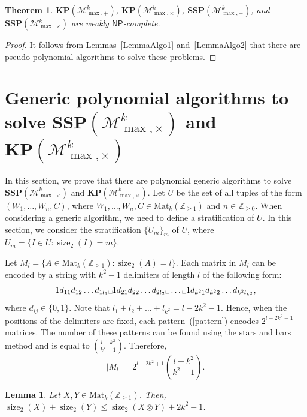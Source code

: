 \documentclass[reqno,12pt]{amsart}
\newtheorem{lemma}{Lemma}
\newtheorem{theorem}{Theorem}
\theoremstyle{definition}
\newcommand{\Mat}{\mathrm{Mat}}
\newcommand{\NP}{\mathsf{NP}}
\newcommand{\MP}{\mathcal{M}_{\max, {+}}^k}
\newcommand{\MT}{\mathcal{M}_{\max, {\times}}^k}
\newcommand{\SSMPP}{\mathbf{SSP}(\MP)}
\newcommand{\SSMTP}{\mathbf{SSP}(\MT)}
\newcommand{\KMPP}{\mathbf{KP}(\MP)}
\newcommand{\KMTP}{\mathbf{KP}(\MT)}
\DeclareMathOperator{\size}{size}
\begin{document}
\begin{theorem}\label{Th2}
$\KMPP$, $\KMTP$, $\SSMPP$, and $\SSMTP$
are weakly $\NP$-complete.
\end{theorem}
\begin{proof}
It follows from Lemmas~\ref{LemmaAlgo1} and~\ref{LemmaAlgo2} that
there are pseudo-polynomial algorithms to solve these problems.
\end{proof}

\section{Generic polynomial algorithms to solve \texorpdfstring{$\SSMTP$}{SSP(M\_{max, ×}\^{}k)} and \texorpdfstring{$\KMTP$}{KP(M\_{max, ×}\^{}k)}}

In this section, we prove that there are polynomial generic algorithms to solve $\SSMTP$ and $\KMTP$.
Let $U$ be the set of all tuples of the form $(W_1, \ldots, W_n, C)$, 
where $W_1, \ldots, W_n, C \in \Mat_k(\mathbb{Z}_{\geq 1})$ and $n \in \mathbb{Z}_{\geq 0}$.
When considering a generic algorithm, we need to define a stratification of $U$.
In this section, we consider the stratification $\{U_m\}_m$ of $U$,
where $U_m = \{I \in U : \size_2(I) = m\}$. 

Let $M_l = \{A \in \Mat_k(\mathbb{Z}_{\geq 1}) : \size_2(A) = l\}$.
Each matrix in $M_l$ can be encoded by a string with $k^2 - 1$ delimiters of length $l$ of the following form:
\begin{equation}\label{pattern}
1d_{11}d_{12}\ldots d_{1l_1} \text{\textvisiblespace} 1d_{21}d_{22}\ldots d_{2l_2}\text{\textvisiblespace}\ldots\text{\textvisiblespace}1d_{k^21}d_{k^22}\ldots d_{k^2l_{k^2}},
\end{equation}
where $d_{ij} \in \{0, 1\}$.
Note that $l_1 + l_2 + \ldots + l_{k^2} = l - 2k^2 - 1$. Hence,
when the positions of the delimiters are fixed, each pattern~(\ref{pattern}) 
encodes $2^{l - 2k^2 - 1}$
matrices. The number of these patterns can be found using the stars and bars method and is equal to $\binom{l - k^2}{k^2 - 1}$. Therefore,
$$
|M_l| = 2^{l - 2k^2 + 1} \binom{l - k^2}{k^2 - 1}.
$$

\begin{lemma}\label{LemmaGen13}
Let $X, Y \in \Mat_k(\mathbb{Z}_{\geq 1})$. 
Then, $\size_2(X) + \size_2(Y) \leq \size_2(X \otimes Y) + 2k^2 - 1$. 
\end{lemma}
\end{document}
